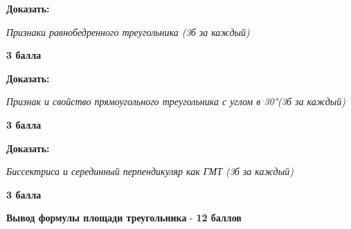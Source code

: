  \textbf{Доказать:}

\textit{Признаки равнобедренного треугольника (3б за каждый)}

\begin{flushright} \textbf{3 балла}\\ 
\end{flushright}

 \textbf{Доказать:}

\textit{Признак и свойство прямоугольного треугольника с углом в 30°(3б за каждый)} 

\begin{flushright} \textbf{3 балла}\\ 
\end{flushright}

 \textbf{Доказать:}

\textit{Биссектриса и серединный перпендикуляр как ГМТ (3б за каждый)}

\begin{flushright} \textbf{3 балла}\\ 
\end{flushright}

 \textbf{Вывод формулы площади треугольника} - \textbf{12 баллов}



